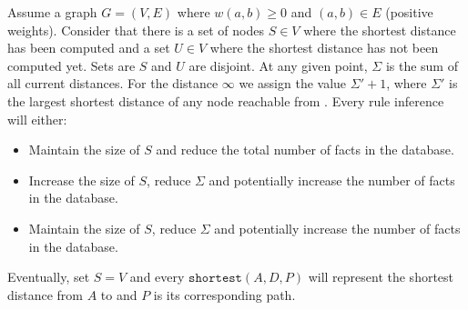 \begin{theorem}[Correctness]

   Assume a graph $G = (V, E)$ where $w(a, b) \geq 0$ and $(a, b) \in E$ (positive
   weights). Consider that there is a set of nodes $S \in V$ where the shortest
   distance has been computed and a set $U \in V$ where the shortest distance
   has not been computed yet. Sets are $S$ and $U$ are disjoint. At any given
   point, $\Sigma$ is the sum of all current distances. For the
   distance $\infty$ we assign the value $\Sigma' + 1$, where $\Sigma'$ is the
   largest shortest distance of any node reachable from . Every rule
   inference will either:

   \begin{itemize}
      \item Maintain the size of $S$ and reduce the total number of facts in
         the database.
      \item Increase the size of $S$, reduce $\Sigma$ and potentially increase the number of
         facts in the database.
      \item Maintain the size of $S$, reduce $\Sigma$
         and potentially increase the number of facts in the database.
   \end{itemize}

   Eventually, set $S = V$ and every $\mathtt{shortest}(A, D, P)$ will represent
   the shortest distance from $A$ to  and $P$ is its corresponding
   path.

\end{theorem}

